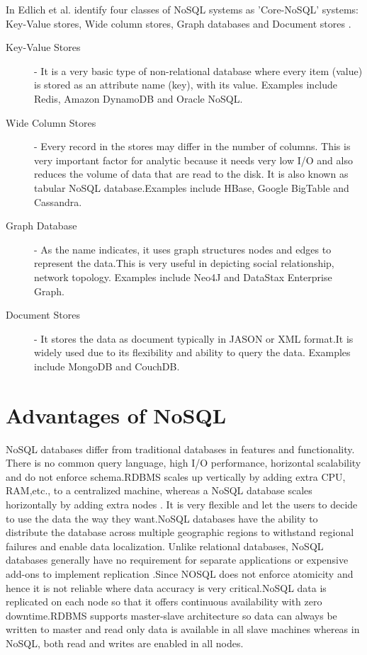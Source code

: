 \documentclass[sigconf]{acmart}
\begin{document}
In Edlich et al. identify four classes of NoSQL systems as 'Core-NoSQL' systems: Key-Value stores, Wide column stores, Graph databases and Document stores \cite{edmodel}.
\begin{description}

\item[Key-Value Stores] - It is a very basic type of non-relational database where every item (value) is stored as an attribute name (key), with its value. Examples include Redis, Amazon DynamoDB and Oracle NoSQL.

\item[Wide Column Stores] - Every record in the stores may differ in the number of columns. This is very important factor for analytic because it needs very low I/O and also reduces the volume of data that are read to the disk. It is also known as tabular NoSQL database.Examples include HBase, Google BigTable and Cassandra.

\item[Graph Database] - As the name indicates, it uses graph structures nodes and edges to represent the data.This is very useful in depicting social relationship, network topology. Examples include Neo4J and DataStax Enterprise Graph. 

\item[Document Stores] - It stores the data as document typically in JASON or XML format.It is widely used due to its flexibility and ability to query the data. Examples include MongoDB and CouchDB.
\end{description}

\section{Advantages of NoSQL}

NoSQL databases differ from traditional databases in features and functionality. There is no common query language, high I/O performance, horizontal scalability and do not enforce schema.RDBMS scales up vertically by adding extra CPU, RAM,etc., to a centralized machine, whereas a NoSQL database scales horizontally by adding extra nodes \cite{DataStax}. It is very flexible and let the users to decide to use the data the way they want.NoSQL databases have the ability to distribute the database across multiple geographic regions to withstand regional failures and enable data localization. Unlike relational databases, NoSQL databases generally have no requirement for separate applications or expensive add-ons to implement replication \cite{mongo}.Since NOSQL does not enforce atomicity and hence it is not reliable where data accuracy is very critical.NoSQL data is replicated on each node so that it offers continuous availability with zero downtime.RDBMS supports master-slave architecture so data can always be written to master and read only data is available in all slave machines whereas in NoSQL, both read and writes are enabled in all nodes.
\end{document}
